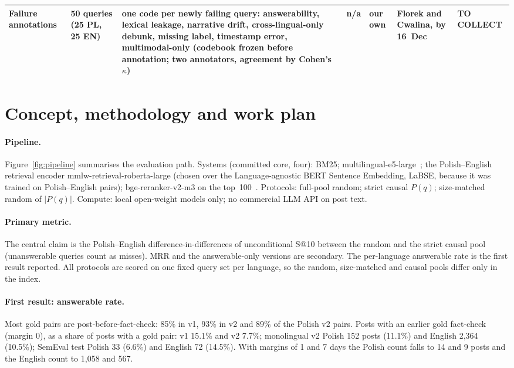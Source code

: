 \documentclass[11pt]{article}
\begin{document}
\begin{table}[!t]
{\begin{tabular}{@{}p{1.9cm}p{2.35cm}p{2.55cm}p{1.95cm}p{2.05cm}p{2.15cm}p{2.35cm}@{}}
Failure annotations & 50 queries (25 PL, 25 EN) & one code per newly failing query: answerability, lexical leakage, narrative drift, cross-lingual-only debunk, missing label, timestamp error, multimodal-only (codebook frozen before annotation; two annotators, agreement by Cohen's $\kappa$) & n/a & our own & Florek and Cwalina, by 16~Dec & TO COLLECT \\
\bottomrule
\end{tabular}%
}
\end{table}

\section{Concept, methodology and work plan}
\label{sec:plan}
\paragraph{Pipeline.}
Figure~\ref{fig:pipeline} summarises the evaluation path.
Systems (committed core, four): BM25; multilingual-e5-large~\cite{wang2024multilingual}; the Polish--English retrieval encoder mmlw-retrieval-roberta-large (chosen over the Language-agnostic BERT Sentence Embedding, LaBSE, because it was trained on Polish--English pairs); bge-reranker-v2-m3 on the top~100~\cite{chen2024m3}.
Protocols: full-pool random; strict causal $P(q)$; size-matched random of $|P(q)|$.
Compute: local open-weight models only; no commercial LLM API on post text.

\paragraph{Primary metric.}
The central claim is the Polish--English difference-in-differences of unconditional S@10 between the random and the strict causal pool (unanswerable queries count as misses).
MRR and the answerable-only versions are secondary.
The per-language answerable rate is the first result reported.
All protocols are scored on one fixed query set per language, so the random, size-matched and causal pools differ only in the index.

\paragraph{First result: answerable rate.}
Most gold pairs are post-before-fact-check: 85\% in v1, 93\% in v2 and 89\% of the Polish v2 pairs.
Posts with an earlier gold fact-check (margin 0), as a share of posts with a gold pair: v1 15.1\% and v2 7.7\%; monolingual v2 Polish 152 posts (11.1\%) and English 2,364 (10.5\%); SemEval test Polish 33 (6.6\%) and English 72 (14.5\%).
With margins of 1 and 7 days the Polish count falls to 14 and 9 posts and the English count to 1,058 and 567.
\end{document}
